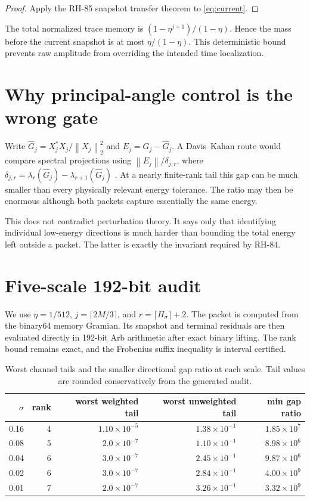 \documentclass[11pt]{article}
\theoremstyle{remark}
\newcommand{\norm}[1]{\left\lVert#1\right\rVert}
\begin{document}
\begin{proof}
Apply the RH-85 snapshot transfer theorem to \eqref{eq:current}.
\end{proof}

The total normalized trace memory is
$(1-\eta^{j+1})/(1-\eta)$.  Hence the mass before the current snapshot is at
most $\eta/(1-\eta)$.  This deterministic bound prevents raw amplitude from
overriding the intended time localization.

\section{Why principal-angle control is the wrong gate}

Write $\widehat G_j=X_j^*X_j/\norm{X_j}_2^2$ and
$E_j=G_j-\widehat G_j$.  A Davis--Kahan route would compare spectral
projections using $\norm{E_j}/\delta_{j,r}$, where
$\delta_{j,r}=\lambda_r(\widehat G_j)-\lambda_{r+1}(\widehat G_j)$
\citep{StewartSun1990}.  At a nearly finite-rank tail this gap can be much
smaller than every physically relevant energy tolerance.  The ratio may then
be enormous although both packets capture essentially the same energy.

This does not contradict perturbation theory.  It says only that identifying
individual low-energy directions is much harder than bounding the total
energy left outside a packet.  The latter is exactly the invariant required
by RH-84.

\section{Five-scale 192-bit audit}

We use $\eta=1/512$, $j=\lceil2M/3\rceil$, and
$r=\lceil H_\sigma\rceil+2$.  The packet is computed from the binary64 memory
Gramian.  Its snapshot and terminal residuals are then evaluated directly in
192-bit Arb arithmetic after exact binary lifting.  The rank bound remains
exact, and the Frobenius suffix inequality is interval certified.

\begin{table}[ht]
\centering
\small
\begin{tabular}{rrrrr}
\toprule
$\sigma$ & rank & worst weighted tail & worst unweighted tail & min gap ratio\\
\midrule
0.16 & 4 & $1.10\times10^{-5}$ & $1.38\times10^{-1}$ & $1.85\times10^7$\\
0.08 & 5 & $2.0\times10^{-7}$ & $1.10\times10^{-1}$ & $8.98\times10^6$\\
0.04 & 6 & $3.0\times10^{-7}$ & $2.45\times10^{-1}$ & $9.87\times10^6$\\
0.02 & 6 & $3.0\times10^{-7}$ & $2.84\times10^{-1}$ & $4.00\times10^9$\\
0.01 & 7 & $2.0\times10^{-7}$ & $3.26\times10^{-1}$ & $3.32\times10^9$\\
\bottomrule
\end{tabular}
\caption{Worst channel tails and the smaller directional gap ratio at each
scale.  Tail values are rounded conservatively from the generated audit.}
\label{tab:audit}
\end{table}
\end{document}
